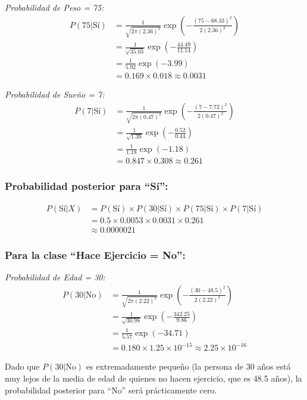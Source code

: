 \documentclass[12pt]{article}
\begin{document}
\textit{Probabilidad de Peso = 75:}
\begin{align*}
P(75|\text{Sí}) &= \frac{1}{\sqrt{2\pi(2.36)^2}} \exp\left(-\frac{(75-68.33)^2}{2(2.36)^2}\right) \\
&= \frac{1}{\sqrt{35.03}} \exp\left(-\frac{44.49}{11.14}\right) \\
&= \frac{1}{5.92} \exp(-3.99) \\
&= 0.169 \times 0.018 \approx 0.0031
\end{align*}

\textit{Probabilidad de Sueño = 7:}
\begin{align*}
P(7|\text{Sí}) &= \frac{1}{\sqrt{2\pi(0.47)^2}} \exp\left(-\frac{(7-7.72)^2}{2(0.47)^2}\right) \\
&= \frac{1}{\sqrt{1.39}} \exp\left(-\frac{0.52}{0.44}\right) \\
&= \frac{1}{1.18} \exp(-1.18) \\
&= 0.847 \times 0.308 \approx 0.261
\end{align*}

\subsubsection{Probabilidad posterior para ``Sí'':}
\begin{align*}
P(\text{Sí}|X) &= P(\text{Sí}) \times P(30|\text{Sí}) \times P(75|\text{Sí}) \times P(7|\text{Sí}) \\
&= 0.5 \times 0.0053 \times 0.0031 \times 0.261 \\
&\approx 0.0000021
\end{align*}

\subsubsection{Para la clase ``Hace Ejercicio = No'':}

\textit{Probabilidad de Edad = 30:}
\begin{align*}
P(30|\text{No}) &= \frac{1}{\sqrt{2\pi(2.22)^2}} \exp\left(-\frac{(30-48.5)^2}{2(2.22)^2}\right) \\
&= \frac{1}{\sqrt{30.98}} \exp\left(-\frac{342.25}{9.86}\right) \\
&= \frac{1}{5.57} \exp(-34.71) \\
&= 0.180 \times 1.25 \times 10^{-15} \approx 2.25 \times 10^{-16}
\end{align*}

Dado que $P(30|\text{No})$ es extremadamente pequeño (la persona de 30 años está muy lejos de la media de edad de quienes no hacen ejercicio, que es 48.5 años), la probabilidad posterior para ``No'' será prácticamente cero.
\end{document}
